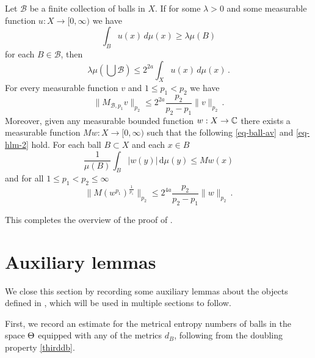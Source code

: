 \begin{proposition}
\label{Hardy-Littlewood}
\leanok
{}
   Let $\mathcal{B}$ be a finite collection of balls in $X$.
If for some $\lambda>0$ and some measurable function $u:X\to [0,\infty)$ we have
\begin{equation}\label{eq-ball-assumption}
\int_{B} u(x)\, d\mu(x)\ge \lambda \mu(B)
\end{equation}
for each $B\in \mathcal{B}$, then
\begin{equation}\label{eq-besico}
    \lambda \mu(\bigcup \mathcal{B}) \le 2^{2a}\int_X u(x)\, d\mu(x)\, .
\end{equation}
For every measurable function $v$
and $1\le p_1<p_2$ we have
\begin{equation}\label{eq-hlm}
    \|M_{\mathcal{B},p_1} v\|_{p_2}\le 2^{2a}\frac{p_2}{p_2-p_1} \|v\|_{p_2}\, .
\end{equation}
Moreover, given any measurable bounded function $w: X \to \mathbb{C}$ there exists a measurable function $Mw: X \to [0, \infty)$ such that the following \eqref{eq-ball-av} and \eqref{eq-hlm-2} hold. For each ball $B \subset X$ and each $x \in B$
\begin{equation}
    \label{eq-ball-av}
    \frac{1}{\mu(B)} \int_{B} |w(y)| \, \mathrm{d}\mu(y) \le Mw(x)
\end{equation}
and for all $1 \le p_1 < p_2 \le \infty$
\begin{equation}
    \label{eq-hlm-2}
    \|M(w^{p_1})^{\frac{1}{p_1}}\|_{p_2} \le 2^{4a} \frac{p_2}{p_2-p_1}\|w\|_{p_2}\,.
\end{equation}

\end{proposition}

This completes the overview of the proof of .

\section{Auxiliary lemmas}
\label{global-auxiliary-lemmas}
We close this section by recording some auxiliary lemmas about the objects defined in , which will be used in multiple sections to follow.

First, we record an estimate for the metrical entropy numbers of balls in the space ${\Theta}$ equipped with any of the metrics $d_B$, following from the doubling property \eqref{thirddb}.

